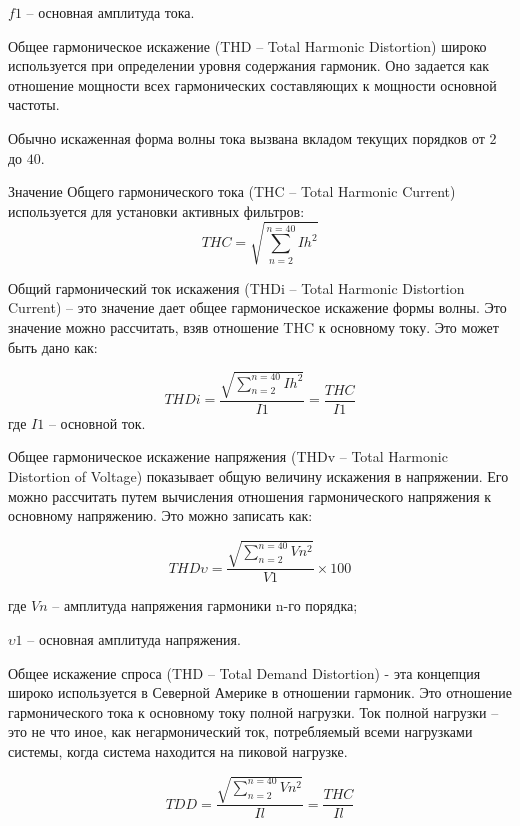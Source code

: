 $f1$ – основная амплитуда тока.

Общее гармоническое искажение (THD – Total Harmonic Distortion) широко используется при определении уровня содержания гармоник. Оно задается как отношение мощности всех гармонических составляющих к мощности основной частоты.

Обычно искаженная форма волны тока вызвана вкладом текущих порядков от $2$ до $40$. 

Значение Общего гармонического тока (THC – Total Harmonic Current) используется для установки активных фильтров:
\begin{equation}
	\label{eq:equation1.13}
	THC = \sqrt{\displaystyle\sum_{n=2}^{n=40} Ih^2}
\end{equation} 

Общий гармонический ток искажения (THDi – Total Harmonic Distortion Current) -- это значение дает общее гармоническое искажение формы волны. Это значение можно рассчитать, взяв отношение THC к основному току. Это может быть дано как:

\begin{equation}
	\label{eq:equation1.14}
	THDi = \frac{\sqrt{\displaystyle\sum_{n=2}^{n=40} Ih^2}}{I1} = \frac{THC}{I1}
\end{equation} 
где $I1$ – основной ток.

Общее гармоническое искажение напряжения (THDv – Total Harmonic Distortion of Voltage) показывает общую величину искажения в напряжении. Его можно рассчитать путем вычисления отношения гармонического напряжения к основному напряжению. Это можно записать как:

\begin{equation}
	\label{eq:equation1.15}
	THD\upsilon = \frac{\sqrt{\displaystyle\sum_{n=2}^{n=40} Vn^2}}{V1} \times 100 
\end{equation} 

где $Vn$ – амплитуда напряжения гармоники n-го порядка;

$\upsilon 1$ – основная амплитуда напряжения.

Общее искажение спроса (THD – Total Demand Distortion) - эта концепция широко используется в Северной Америке в отношении гармоник. Это отношение гармонического тока к основному току полной нагрузки. Ток полной нагрузки – это не что иное, как негармонический ток, потребляемый всеми нагрузками системы, когда система находится на пиковой нагрузке.

\begin{equation}
	\label{eq:equation1.16}
	TDD = \frac{\sqrt{\displaystyle\sum_{n=2}^{n=40} Vn^2}}{Il} = \frac{THC}{Il}
\end{equation} 

